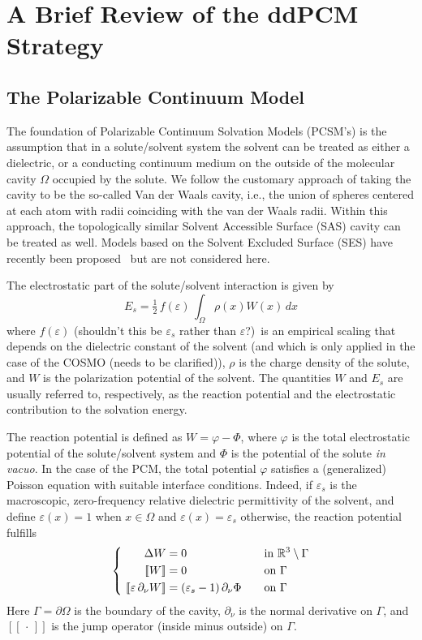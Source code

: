 \section{A Brief Review of the ddPCM Strategy}\label{sec:review}

\subsection{The Polarizable Continuum Model}
The foundation of Polarizable Continuum Solvation Models (PCSM's) is the assumption that in a solute/solvent system the solvent can be treated as either a dielectric, or a conducting continuum medium on the outside of the molecular cavity $\Omega$ occupied by the solute. We follow the customary approach of taking the cavity to be the so-called Van der Waals cavity\cite{ReviewPCM_2005}, i.e., the union of spheres centered at each atom with radii coinciding with the van der Waals radii.
Within this approach, the topologically similar Solvent Accessible Surface (SAS) cavity can be treated as well. 
Models based on the Solvent Excluded Surface (SES) have recently been proposed~\cite{} but are not considered here.

The electrostatic part of the solute/solvent interaction is given by
\[
E_s = \tfrac{1}{2}\, f(\varepsilon)\,\int_\Omega \rho(x) W(x) \, dx
\]
where $f(\varepsilon)$ {\color{red}(shouldn't this be $\varepsilon_s$ rather than $\varepsilon$?)~}is an empirical scaling that depends on the dielectric constant of the solvent (and which is only applied in the case of the COSMO {\color{red}(needs to be clarified)}), $\rho$ is the charge density of the solute, and $W$ is the polarization potential of the solvent. The quantities $W$ and $E_s$ are usually referred to, respectively, as the reaction potential and the electrostatic contribution to the solvation energy. 

The reaction potential is defined as $W = \varphi - \Phi$, where $\varphi$ is the total electrostatic potential of the solute/solvent system and $\Phi$ is the potential of the solute \emph{in vacuo}. In the case of the PCM, the total potential $\varphi$ satisfies a (generalized) Poisson equation with suitable interface conditions\cite{Mennucci_JCP_IEF1,Mennucci_JMC_IEF2}. Indeed, if $\varepsilon_s$ is the macroscopic, zero-frequency relative dielectric permittivity of the solvent, and define $\varepsilon(x) = 1$ when $x \in \Omega$ and $\varepsilon(x) = \varepsilon_s$ otherwise, the reaction potential fulfills 
\begin{equation} 
\label{eq:pcmpde}
\left \{ 
\begin{alignedat}{4}
\Delta  W &= 0  &&\mbox{in } \mathbb{R}^3\setminus \Gamma  \\
 \ [\![W]\!] &= 0  &&\mbox{on } \Gamma\\
\  [\![\varepsilon \, \partial_\nu W]\!] &= (\varepsilon_s-1)\, \partial_\nu \Phi &\qquad& \mbox{on } \Gamma
\end{alignedat} 
\right.
\end{equation}
Here $\Gamma=\partial\Omega$ is the boundary of the cavity, $\partial_\nu$ is the normal derivative on $\Gamma$, and $[\![\,\cdot\,]\!]$ is the jump operator (inside minus outside) on $\Gamma$.

